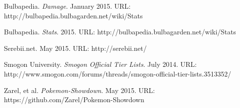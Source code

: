 \documentclass{acm_proc_article-sp}
\begin{document}
\begin{thebibliography}{5}

  Bulbapedia.
  \emph{Damage}.
  January 2015.
  URL: http://bulbapedia.bulbagarden.net/wiki/Stats

  Bulbapedia.
  \emph{Stats}.
  2015.
  URL: http://bulbapedia.bulbagarden.net/wiki/Stats

  Serebii.net.
  May 2015.
  URL: http://serebii.net/

  Smogon University.
  \emph{Smogon Official Tier Lists}.
  July 2014.
  URL: http://www.smogon.com/forums/threads/smogon-official-tier-lists.3513352/

  Zarel, et al.
  \emph{Pokemon-Showdown}.
  May 2015.
  URL: https://github.com/Zarel/Pokemon-Showdown

\end{thebibliography}
\end{document}

